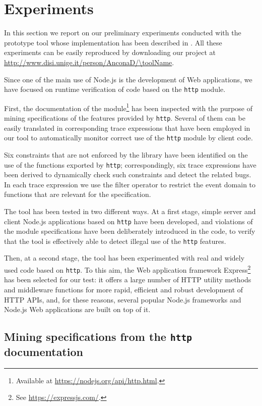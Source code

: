 \section{Experiments}
\label{sec:exps}

In this section we report on our preliminary experiments conducted with the prototype tool
whose implementation has been described in . All these experiments can be
easily reproduced by downloading our project at \url{http://www.disi.unige.it/person/AnconaD/\toolName}.

Since one of the main use of Node.js is the development of Web applications,
we have focused on runtime verification of code based on the \lstinline{http} module.

First, the documentation of the module\footnote{Available at \url{https://nodejs.org/api/http.html}.} has been inspected  
with the purpose of mining specifications of the features provided by \lstinline{http}.
Several of them can be easily translated in corresponding trace expressions
that have been employed in our tool to automatically monitor correct use of the \lstinline{http}
module by client code.

Six constraints that are not enforced by the library have been identified on the use of the functions exported by \lstinline{http};
correspondingly, six trace expressions have been derived to
dynamically check such constraints and detect the related bugs.
In each trace expression we use the filter operator to restrict the event domain to functions that are relevant for the specification.

The tool has been tested in two different ways.
At a first stage, simple server and client Node.js applications based on \lstinline{http} have been developed,
and violations of the module specifications have been deliberately introduced in the code,
to verify that the tool is effectively able to detect illegal use of the \lstinline{http} features.

Then, at a second stage, the tool has been experimented with real and widely used code based on  \lstinline{http}.
To this aim, the Web application framework Express\footnote{See \url{https://expressjs.com/}.} has been
selected for our test: it offers a large number of HTTP utility methods and middleware functions for more rapid, efficient
and robust development of HTTP APIs, and, for these reasons, several popular Node.js frameworks and Node.js Web applications
are built on top of it. 

\subsection{Mining specifications from the \lstinline{http} documentation}\label{sec:spec-minining}

